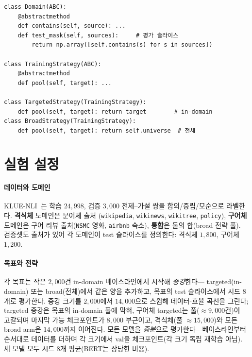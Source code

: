 \documentclass[conference]{IEEEtran}
\begin{document}
\begin{lstlisting}[caption={데이터 축의 객체화: \texttt{Domain}은 학습 풀이자
test 슬라이스; \texttt{TrainingStrategy}는 목표를 학습 풀로 사상.}, label={lst:strategy}]
class Domain(ABC):
    @abstractmethod
    def contains(self, source): ...
    def test_mask(self, sources):     # 평가 슬라이스
        return np.array([self.contains(s) for s in sources])

class TrainingStrategy(ABC):
    @abstractmethod
    def pool(self, target): ...

class TargetedStrategy(TrainingStrategy):
    def pool(self, target): return target        # in-domain
class BroadStrategy(TrainingStrategy):
    def pool(self, target): return self.universe  # 전체
\end{lstlisting}

\section{실험 설정}
\label{sec:setup}
\paragraph*{데이터와 도메인}
KLUE-NLI~\cite{park2021klue}는 학습 $24{,}998$, 검증 $3{,}000$ 전제--가설 쌍을
함의/중립/모순으로 라벨한다. \textbf{격식체} 도메인은 문어체 출처
(\texttt{wikipedia}, \texttt{wikinews}, \texttt{wikitree}, \texttt{policy}),
\textbf{구어체} 도메인은 구어 리뷰 출처(\texttt{NSMC} 영화, \texttt{airbnb} 숙소),
\textbf{통합}은 둘의 합(broad 전략 풀). 검증셋도 출처가 있어 각 도메인이 test
슬라이스를 정의한다: 격식체 $1{,}800$, 구어체 $1{,}200$.

\paragraph*{목표와 전략}
각 목표는 작은 $2{,}000$건 in-domain 베이스라인에서 시작해 \emph{증강}한다---
targeted(in-domain) 또는 broad(전체)에서 같은 양을 추가하고, 목표의 test
슬라이스에서 시드 $8$개로 평가한다. 증강 크기를 $2{,}000$에서 $14{,}000$으로
스윕해 데이터-효율 곡선을 그린다; targeted 증강은 목표의 in-domain 풀에 막혀,
구어체 targeted는 풀($\approx 9{,}000$건)이 고갈되며 마지막 가능 체크포인트가 $8{,}000$
부근이고, 격식체(풀 $\approx 15{,}000$)와 모든 broad arm은 $14{,}000$까지 이어진다. 모든 모델을 \emph{증분}으로 평가한다---베이스라인부터 순서대로 데이터를 더하며 각
크기에서 val을 체크포인트(각 크기 독립 재학습 아님). 세 모델 모두 시드 $8$개 평균(BERT는 상당한 비용).
\end{document}
